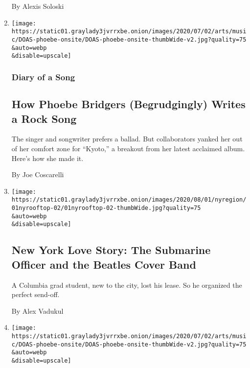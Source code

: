 \begin{enumerate}
  By Alexis Soloski
\item
  \href{/2020/07/30/arts/music/phoebe-bridgers-kyoto.html}{}

  \texttt{[image: https://static01.graylady3jvrrxbe.onion/images/2020/07/02/arts/music/DOAS-phoebe-onsite/DOAS-phoebe-onsite-thumbWide-v2.jpg?quality=75\\\&auto=webp\\\&disable=upscale]}

  \hypertarget{diary-of-a-song}{%
  \subsubsection{Diary of a Song}\label{diary-of-a-song}}

  \hypertarget{how-phoebe-bridgers-begrudgingly-writes-a-rock-song}{%
  \subsection{How Phoebe Bridgers (Begrudgingly) Writes a Rock
  Song}\label{how-phoebe-bridgers-begrudgingly-writes-a-rock-song}}

  The singer and songwriter prefers a ballad. But collaborators yanked
  her out of her comfort zone for ``Kyoto,'' a breakout from her latest
  acclaimed album. Here's how she made it.

  By Joe Coscarelli
\item
  \href{/2020/07/30/nyregion/coronavirus-beatles-nyc.html}{}

  \texttt{[image: https://static01.graylady3jvrrxbe.onion/images/2020/08/01/nyregion/01nyrooftop-02/01nyrooftop-02-thumbWide.jpg?quality=75\\\&auto=webp\\\&disable=upscale]}

  \hypertarget{new-york-love-story-the-submarine-officer-and-the-beatles-cover-band}{%
  \subsection{New York Love Story: The Submarine Officer and the Beatles
  Cover
  Band}\label{new-york-love-story-the-submarine-officer-and-the-beatles-cover-band}}

  A Columbia grad student, new to the city, lost his lease. So he
  organized the perfect send-off.

  By Alex Vadukul
\item
  \href{/video/arts/music/100000007258359/phoebe-bridgers-kyoto.html}{}

  \texttt{[image: https://static01.graylady3jvrrxbe.onion/images/2020/07/02/arts/music/DOAS-phoebe-onsite/DOAS-phoebe-onsite-thumbWide-v2.jpg?quality=75\\\&auto=webp\\\&disable=upscale]}


\end{enumerate}
